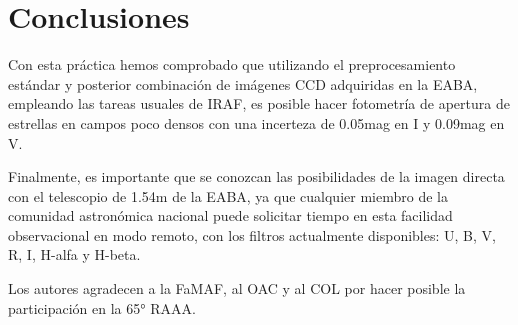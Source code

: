 \documentclass[baaa]{baaa}
\begin{document}
\section{Conclusiones}
 Con esta práctica hemos comprobado que utilizando el preprocesamiento estándar y posterior combinación de imágenes CCD adquiridas en la EABA, empleando las tareas usuales de IRAF, es posible hacer fotometría de apertura de estrellas en campos poco densos con una incerteza de 0.05mag en I y 0.09mag en V.

 
 Finalmente, es importante que se conozcan las posibilidades de la imagen directa con el telescopio de 1.54m de la EABA, ya que cualquier miembro de la comunidad astronómica nacional puede solicitar tiempo en esta facilidad observacional en modo remoto, con los filtros actualmente disponibles: U, B, V, R, I, H-alfa y H-beta.














\begin{acknowledgement}
{Los autores agradecen a la FaMAF, al OAC y al COL por hacer posible la participación en la 65° RAAA}.
\end{acknowledgement}
\end{document}
